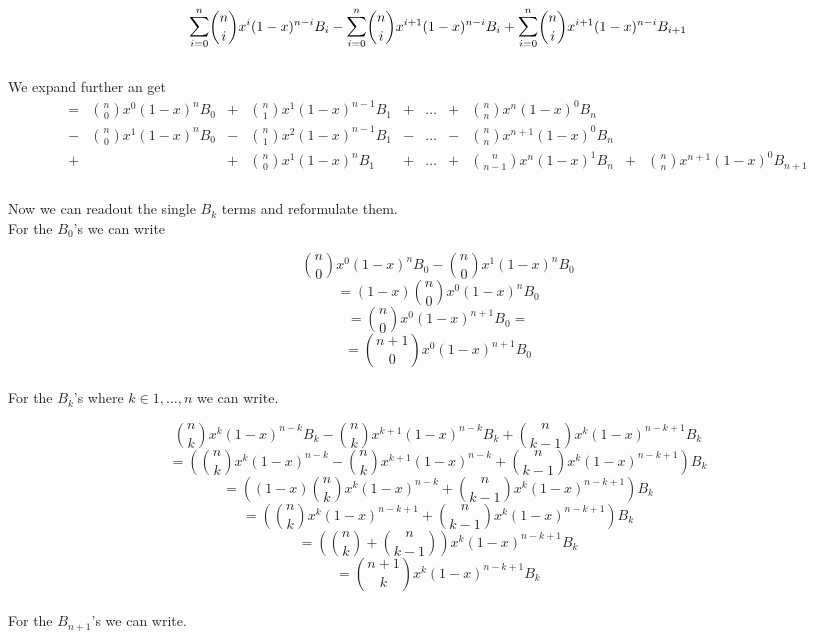 \begin{equation*}
    \mathlarger{\sum}_{i = 0}^{n} {n \choose i}x^i (1-x)^{n-i}B_i -\mathlarger{\sum}_{i = 0}^{n} {n \choose i}x^{i+1} (1-x)^{n-i}B_i + \mathlarger{\sum}_{i = 0}^{n} {n \choose i}x^{i+1} (1-x)^{n-i} B_{i+1}
\end{equation*}
\\
We expand further an get
\begin{align*}
    = & {n \choose 0}x^{0} (1-x)^{n}B_0 & + & {n \choose 1}x^1 (1-x)^{n-1}B_1 & + & \ldots & + & {n \choose n}  x^{n}   (1-x)^{0}B_n &   & \\
    - & {n \choose 0}x^{1} (1-x)^{n}B_0 & - & {n \choose 1}x^2 (1-x)^{n-1}B_1 & - & \ldots & - & {n \choose n}  x^{n+1} (1-x)^{0}B_n &   & \\
    + &                                 & + & {n \choose 0}x^1 (1-x)^{n}  B_1 & + & \ldots & + & {n \choose n-1}x^{n}   (1-x)^{1}B_n & + & {n \choose n}x^{n+1} (1-x)^{0} B_{n+1} \\
\end{align*}
\\
Now we can readout the single $B_k$ terms and reformulate them.
\\
For the $B_0$'s we can write

\begin{equation*}
    {n \choose 0}x^0 (1-x)^n B_0 - {n \choose 0}x^1 (1-x)^n B_0
\end{equation*}
\begin{equation*}
    =(1-x){n \choose 0}x^0 (1-x)^n B_0
\end{equation*}
\begin{equation*}
    ={n \choose 0}x^0 (1-x)^{n+1}B_0 =\end{equation*}
\begin{equation*}
    ={n+1 \choose 0}x^0 (1-x)^{n+1}B_0
\end{equation*}
\\
For the $B_k$'s where $k\in {1, \ldots, n}$ we can write.

\begin{equation*}
    {n \choose k}x^k (1-x)^{n-k} B_k - {n \choose k}x^{k+1} (1-x)^{n-k} B_k + {n \choose k - 1}x^k (1-x)^{n-k+1} B_k
\end{equation*}
\begin{equation*}
    =({n \choose k}x^k (1-x)^{n-k} - {n \choose k}x^{k+1} (1-x)^{n-k} + {n \choose k - 1}x^k (1-x)^{n-k+1})B_k
\end{equation*}
\begin{equation*}
    =((1-x){n \choose k}x^k (1-x)^{n-k} + {n \choose k - 1}x^k (1-x)^{n-k+1})B_k
\end{equation*}
\begin{equation*}
    =({n \choose k}x^k (1-x)^{n-k+1} + {n \choose k - 1}x^k (1-x)^{n-k+1})B_k
\end{equation*}
\begin{equation*}
    =({n \choose k} + {n \choose k - 1})x^k(1-x)^{n-k+1}B_k
\end{equation*}
\begin{equation*}
    ={n+1 \choose k}x^k(1-x)^{n-k+1}B_k
\end{equation*}
\\
For the $B_{n+1}$'s we can write.

